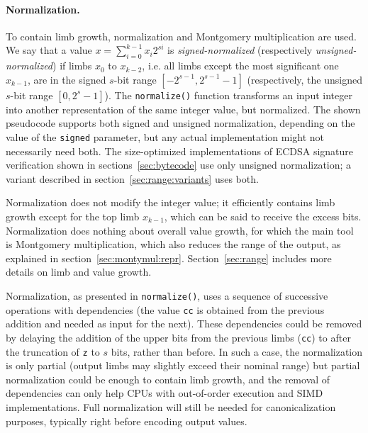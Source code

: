 \documentclass{llncs}
\begin{document}
\paragraph{Normalization.}
To contain limb growth, normalization and Montgomery multiplication are
used. We say that a value $x = \sum_{i=0}^{k-1} x_i 2^{si}$ is
\emph{signed-normalized} (respectively \emph{unsigned-normalized}) if
limbs $x_0$ to $x_{k-2}$, i.e. all limbs except the most significant one
$x_{k-1}$, are in the signed $s$-bit range $[-2^{s-1}, 2^{s-1} - 1]$
(respectively, the unsigned $s$-bit range $[0, 2^s - 1]$). The
\verb+normalize()+ function transforms an input integer into another
representation of the same integer value, but normalized. The shown
pseudocode supports both signed and unsigned normalization, depending on
the value of the \verb+signed+ parameter, but any actual implementation
might not necessarily need both. The size-optimized implementations of
ECDSA signature verification shown in sections~\ref{sec:bytecode} use
only unsigned normalization; a variant described in
section~\ref{sec:range:variants} uses both.

Normalization does not modify the integer value; it efficiently contains
limb growth except for the top limb $x_{k-1}$, which can be said to
receive the excess bits. Normalization does nothing about overall value
growth, for which the main tool is Montgomery multiplication, which also
reduces the range of the output, as explained in
section~\ref{sec:montymul:repr}. Section~\ref{sec:range} includes more
details on limb and value growth.

Normalization, as presented in \verb+normalize()+, uses a sequence of
successive operations with dependencies (the value \verb+cc+ is obtained
from the previous addition and needed as input for the next). These
dependencies could be removed by delaying the addition of the upper bits
from the previous limbs (\verb+cc+) to after the truncation of \verb+z+
to $s$ bits, rather than before. In such a case, the normalization is
only partial (output limbs may slightly exceed their nominal range) but
partial normalization could be enough to contain limb growth, and the
removal of dependencies can only help CPUs with out-of-order execution
and SIMD implementations. Full normalization will still be needed for
canonicalization purposes, typically right before encoding output
values.
\end{document}
